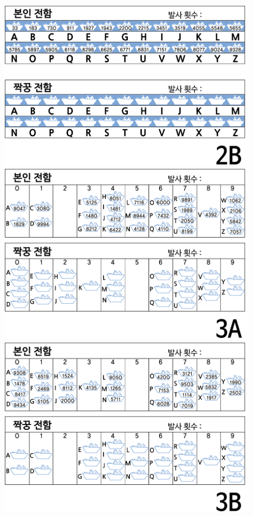 \documentclass[]{article}
\begin{document}
\includegraphics{csunplugged/02-part/img/ch06-search/06-search-01-battleship-2B.png}
\includegraphics{csunplugged/02-part/img/ch06-search/06-search-01-battleship-3A.png}
\includegraphics{csunplugged/02-part/img/ch06-search/06-search-01-battleship-3B.png}
\end{document}
